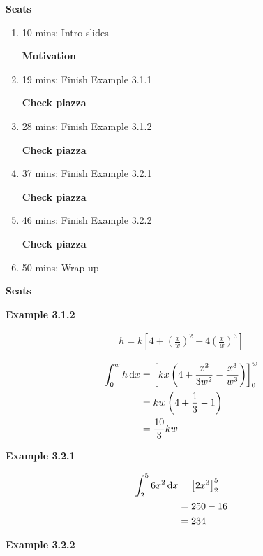 \textbf{Seats}
\begin{enumerate}
    \item 10 mins: Intro slides \par
    \textbf{Motivation}
    \item 19 mins: Finish Example 3.1.1 \par
    \textbf{Check piazza}
    \item 28 mins: Finish Example 3.1.2 \par
    \textbf{Check piazza}
    \item 37 mins: Finish Example 3.2.1 \par
    \textbf{Check piazza}
    \item 46 mins: Finish Example 3.2.2 \par
    \textbf{Check piazza}
    \item 50 mins: Wrap up \par
\end{enumerate}
\textbf{Seats}

\vspace{10mm}
\textbf{Example 3.1.2}

\begin{align*}
    h = k\left[4 + \left(\frac{x}{w}\right)^2 -4\left(\frac{x}{w} \right)^3\right]
\end{align*}

\begin{align*}
\int_0^w h \,{\rm d}x &= \left[kx\left(4 + \frac{x^2}{3w^2} - \frac{x^3}{w^3}\right)\right]_0^w \\
&= kw\left(4+\frac{1}{3}-1\right) \\
&= \frac{10}{3}kw
\end{align*}

\vspace{10mm}
\textbf{Example 3.2.1}

\begin{align*}
\int_2^5 6x^2 \,{\rm d}x &= \left[2x^3\right]_2^5 \\
&= 250 - 16 \\
&= 234
\end{align*}

\vspace{10mm}
\textbf{Example 3.2.2}

